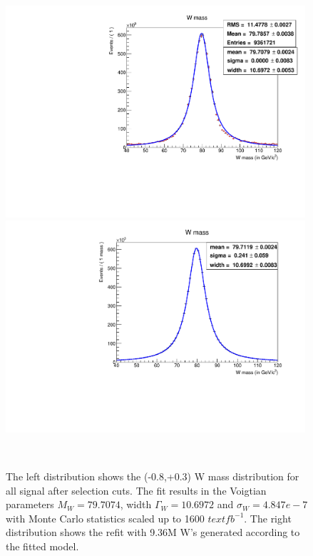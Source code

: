 \begin{figure}
\label{fig:badfit}
\centering
    \begin{minipage}{0.49\textwidth}
        \centering
        \includegraphics[width=0.99\textwidth]{WWSfit.pdf} %
   
    \end{minipage}\hfill
    \begin{minipage}{0.49\textwidth}
        \centering
        \includegraphics[width=0.99\textwidth]{Wtoyfit.pdf} %
     
     \end{minipage}\\
     \caption{ The left distribution shows the (-0.8,+0.3) W mass distribution for all signal after selection cuts. The fit results in the Voigtian parameters $M_W = 79.7074$, width $\Gamma_W = 10.6972$ and $\sigma_W = 4.847e-7$ with Monte Carlo statistics scaled up to 1600 $text{fb}^{-1}$. The right distribution shows the refit with 9.36M W's generated according to the fitted model.}



\end{figure}


